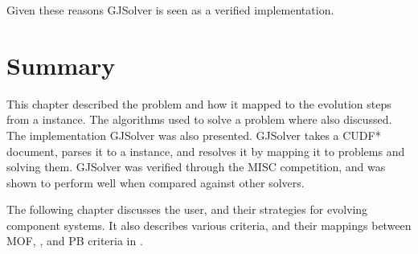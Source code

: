 Given these reasons GJSolver is seen as a verified implementation.

\section{Summary}
This chapter described the \modelimpl problem and how it mapped to the evolution steps from a \modelname instance.
The algorithms used to solve a \modelimpl problem where also discussed.
The implementation GJSolver was also presented.
GJSolver takes a CUDF* document, parses it to a \modelname instance, and resolves it by mapping it to \modelimpl problems and solving them.
GJSolver was verified through the MISC competition, and was shown to perform well when compared against other solvers.

The following chapter discusses the user, and their strategies for evolving component systems.
It also describes various criteria, and their mappings between MOF, \modelname, and PB criteria in \modelimpl.
